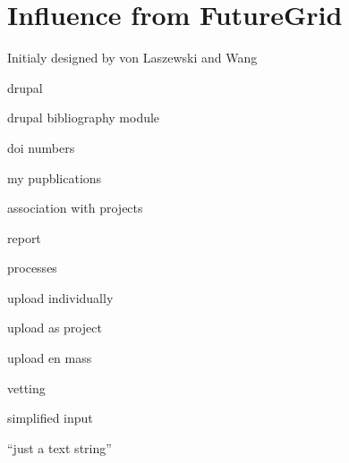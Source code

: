 \section{Influence from FutureGrid}

Initialy designed by von Laszewski and Wang

drupal

drupal bibliography module

doi numbers

my pupblications

association with projects

report

processes

upload individually

upload as project

upload en mass

vetting

simplified input

``just a text string''
\cite{drupal-bib}



